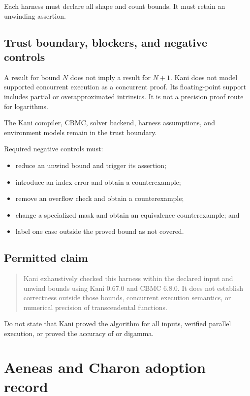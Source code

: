 \documentclass[11pt]{article}
\begin{document}
Each harness must declare all shape and count bounds.  It must retain an unwinding assertion.

\subsection{Trust boundary, blockers, and negative controls}

A result for bound \(N\) does not imply a result for \(N+1\).  Kani does not model supported
concurrent execution as a concurrent proof.  Its floating-point support includes partial or
overapproximated intrinsics.  It is not a precision proof route for logarithms.

The Kani compiler, CBMC, solver backend, harness assumptions, and environment models remain in the
trust boundary.

Required negative controls must:
\begin{itemize}[leftmargin=*]
  \item reduce an unwind bound and trigger its assertion;
  \item introduce an index error and obtain a counterexample;
  \item remove an overflow check and obtain a counterexample;
  \item change a specialized mask and obtain an equivalence counterexample; and
  \item label one case outside the proved bound as not covered.
\end{itemize}

\subsection{Permitted claim}

\begin{quote}
Kani exhaustively checked this harness within the declared input and unwind bounds using Kani
0.67.0 and CBMC 6.8.0.  It does not establish correctness outside those bounds, concurrent
execution semantics, or numerical precision of transcendental functions.
\end{quote}

Do not state that Kani proved the algorithm for all inputs, verified parallel execution, or proved
the accuracy of  or digamma.

\section{Aeneas and Charon adoption record}
\end{document}
